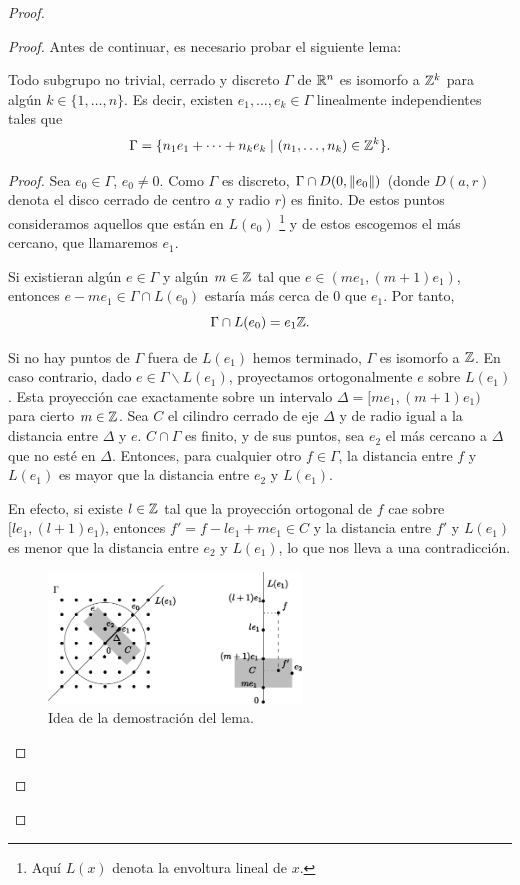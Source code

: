 \begin{proof}
\begin{proof}
  Antes de continuar, es necesario probar el siguiente lema:
  \begin{lema}\label{discreto}
    Todo subgrupo no trivial, cerrado y discreto $\Gamma$ de $\mathbb{R}^n$ es isomorfo a $\mathbb{Z}^k$ para algún $k\in\{1,\dots,n\}$. Es decir, existen $e_1,\dots,e_k \in \Gamma$ linealmente independientes tales que 
    \[
      \Gamma=\{n_1e_1+\cdots+n_ke_k \mid (n_1,\dots,n_k) \in \mathbb{Z}^k \}.
    \]
  \end{lema}
  \begin{proof}
  Sea $e_0 \in \Gamma$, $e_0 \neq 0$. Como $\Gamma$ es discreto, $\Gamma \cap D(0,\left\Vert e_0\right\Vert)$ (donde $D(a,r)$ denota el disco cerrado de centro $a$ y radio $r$) es finito. De estos puntos consideramos aquellos que están en $L(e_0)$ \footnote{Aquí $L(x)$ denota la envoltura lineal de $x$.} y de estos escogemos el más cercano, que llamaremos $e_1$. 
  
  Si existieran algún $e \in \Gamma$ y algún $m \in \mathbb{Z}$ tal que $e \in (me_1,(m+1)e_1)$, entonces $e-me_1 \in \Gamma \cap L(e_0)$ estaría más cerca de 0 que $e_1$. Por tanto, 
  \[
   \Gamma\cap L(e_0) = e_1\mathbb{Z}.
  \]

  Si no hay puntos de $\Gamma$ fuera de $L(e_1)$ hemos terminado, $\Gamma$ es isomorfo a $\mathbb{Z}$. En caso contrario, dado $e \in \Gamma \backslash L(e_1)$, proyectamos ortogonalmente $e$ sobre $L(e_1)$. Esta proyección cae exactamente sobre un intervalo $\Delta=[me_1,(m+1)e_1)$ para cierto $m \in \mathbb{Z}$. Sea $C$ el cilindro cerrado de eje $\Delta$ y de radio igual a la distancia entre $\Delta$ y $e$. $C\cap \Gamma$ es finito, y de sus puntos, sea $e_2$ el más cercano a $\Delta$ que no esté en $\Delta$. Entonces, para cualquier otro $f \in \Gamma$, la distancia entre $f$ y $L(e_1)$ es mayor que la distancia entre $e_2$ y $L(e_1)$. 
    
    En efecto, si existe $l \in \mathbb{Z}$ tal que la proyección ortogonal de $f$ cae sobre $[le_1,(l+1)e_1)$, entonces $f'=f-le_1+me_1 \in C$ y la distancia entre $f'$ y $L(e_1)$ es menor que la distancia entre $e_2$ y $L(e_1)$, lo que nos lleva a una contradicción.

  \begin{figure}[h]
    \centering
    \includegraphics[width=0.6\textwidth]{pics/grupo.pdf}
    \caption{\small Idea de la demostración del lema.}
    \label{fig:grupo}
  \end{figure}


\end{proof}
\end{proof}
\end{proof}
